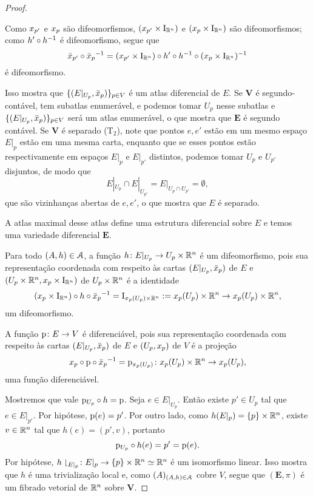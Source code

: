 \begin{proof}
\begin{enumerate}
Como $x_{p'}$ e $x_p$ são difeomorfismos, $(x_{p'} \times \mathrm{I}_{\mathbb{R}^n})$ e $(x_p \times \mathrm{I}_{\mathbb{R}^n})$ são difeomorfismos; como $h' \circ h^{-1}$ é difeomorfismo, segue que
	\begin{equation*}
	\bar{x}_{p'} \circ {\bar{x}_p}^{-1} = (x_{p'} \times \mathrm{I}_{\mathbb{R}^n}) \circ h' \circ h^{-1} \circ (x_p \times \mathrm{I}_{\mathbb{R}^n})^{-1}
	\end{equation*}
é difeomorfismo.

Isso mostra que $\{(E|_{U_p},\bar{x}_p)\}_{p \in V}$ é um atlas diferencial de $E$. Se $\bm V$ é segundo-contável, tem subatlas enumerável, e podemos tomar $U_p$ nesse subatlas e $\{(E|_{U_p},\bar{x}_p)\}_{p \in V}$ será um atlas enumerável, o que mostra que $\bm E$ é segundo contável. Se $\bm V$ é separado (T$_2$), note que pontos $e,e'$ estão em um mesmo espaço $E|_p$ estão em uma mesma carta, enquanto que se esses pontos estão respectivamente em espaços $E|_p$ e $E|_{p'}$ distintos, podemos tomar $U_p$ e $U_{p'}$ disjuntos, de modo que
	\begin{equation*}
	E|_{U_p} \cap E|_{U_{p'}} = E|_{U_p \cap U_{p'}} = \emptyset,
	\end{equation*}
que são vizinhanças abertas de $e,e'$, o que mostra que $E$ é separado.
\end{enumerate}

A atlas maximal desse atlas define uma estrutura diferencial sobre $E$ e temos uma variedade diferencial $\bm E$.

Para todo $(A,h) \in \mathcal{A}$, a função $h\colon E|_{U_p} \to U_p \times \mathbb{R}^n$ é um difeomorfismo, pois sua representação coordenada com respeito às cartas $(E|_{U_p}, \bar{x}_p)$ de $E$ e $(U_p \times \mathbb{R}^n,x_p \times \mathrm{I}_{\mathbb{R}^n})$ de $U_p \times \mathbb{R}^n$ é a identidade
	\begin{equation*}
	(x_p \times \mathrm{I}_{\mathbb{R}^n}) \circ h \circ {\bar{x}_p}^{-1} = \mathrm{I}_{x_p(U_p) \times \mathbb{R}^n} := x_p(U_p) \times \mathbb{R}^n \to x_p(U_p) \times \mathbb{R}^n,
	\end{equation*}
um difeomorfismo.

A função $\mathrm{p}\colon E \to V$ é diferenciável, pois sua representação coordenada com respeito às cartas $(E|_{U_p}, \bar{x}_p)$ de $E$ e $(U_p,x_p)$ de $V$ é a projeção
	\begin{equation*}
	x_p \circ \mathrm{p} \circ {\bar{x}_p}^{-1} = \mathrm{p}_{x_p(U_p)}\colon x_p(U_p) \times \mathbb{R}^n \to x_p(U_p),
	\end{equation*}
uma função diferenciável.

Mostremos que vale $\mathrm{p}_{U_p} \circ h = \mathrm{p}$. Seja $e \in E|_{U_p}$. Então existe $p' \in U_p$ tal que $e \in E|_{p'}$. Por hipótese, $\mathrm{p}(e)=p'$. Por outro lado, como $h(E|_p) = \{p\} \times \mathbb{R}^n$, existe $v \in \mathbb{R}^n$ tal que $h(e) = (p',v)$, portanto
	\begin{equation*}
	\mathrm{p}_{U_p} \circ h(e) = p' = \mathrm{p}(e).
	\end{equation*}
Por hipótese, $h\downharpoonright_{E|_p}\colon E|_p \to \{p\} \times \mathbb{R}^n \simeq \mathbb{R}^n$ é um isomorfismo linear. Isso mostra que $h$ é uma trivialização local e, como $(A)_{(A,h) \in \mathcal{A}}$ cobre $V$, segue que $(\bm E,\pi)$ é um fibrado vetorial de $\mathbb{R}^n$ sobre $\bm V$.


\end{proof}
